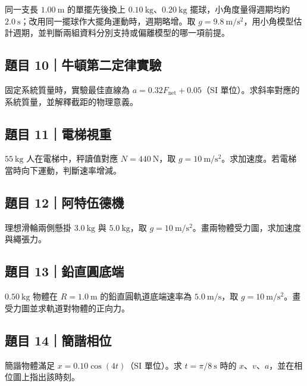 \documentclass[11pt,a4paper]{article}
\begin{document}
同一支長 \(1.00\ \mathrm m\) 的單擺先後換上 \(0.10\ \mathrm{kg}\)、\(0.20\ \mathrm{kg}\) 擺球，小角度量得週期均約 \(2.0\ \mathrm s\)；改用同一擺球作大擺角運動時，週期略增。取 \(g=9.8\ \mathrm{m/s^2}\)，用小角模型估計週期，並判斷兩組資料分別支持或偏離模型的哪一項前提。

\subsection{題目 10｜牛頓第二定律實驗}\label{ux984cux76ee-10ux725bux9813ux7b2cux4e8cux5b9aux5f8bux5be6ux9a57}

固定系統質量時，實驗最佳直線為 \(a=0.32F_{\mathrm{net}}+0.05\)（SI 單位）。求斜率對應的系統質量，並解釋截距的物理意義。

\subsection{題目 11｜電梯視重}\label{ux984cux76ee-11ux96fbux68afux8996ux91cd}

\(55\ \mathrm{kg}\) 人在電梯中，秤讀值對應 \(N=440\ \mathrm N\)，取 \(g=10\ \mathrm{m/s^2}\)。求加速度。若電梯當時向下運動，判斷速率增減。

\subsection{題目 12｜阿特伍德機}\label{ux984cux76ee-12ux963fux7279ux4f0dux5fb7ux6a5f}

理想滑輪兩側懸掛 \(3.0\ \mathrm{kg}\) 與 \(5.0\ \mathrm{kg}\)，取 \(g=10\ \mathrm{m/s^2}\)。畫兩物體受力圖，求加速度與繩張力。

\subsection{題目 13｜鉛直圓底端}\label{ux984cux76ee-13ux925bux76f4ux5713ux5e95ux7aef}

\(0.50\ \mathrm{kg}\) 物體在 \(R=1.0\ \mathrm m\) 的鉛直圓軌道底端速率為 \(5.0\ \mathrm{m/s}\)，取 \(g=10\ \mathrm{m/s^2}\)。畫受力圖並求軌道對物體的正向力。

\subsection{題目 14｜簡諧相位}\label{ux984cux76ee-14ux7c21ux8ae7ux76f8ux4f4d}

簡諧物體滿足 \(x=0.10\cos(4t)\)（SI 單位）。求 \(t=\pi/8\ \mathrm s\) 時的 \(x\)、\(v\)、\(a\)，並在相位圖上指出該時刻。
\end{document}
